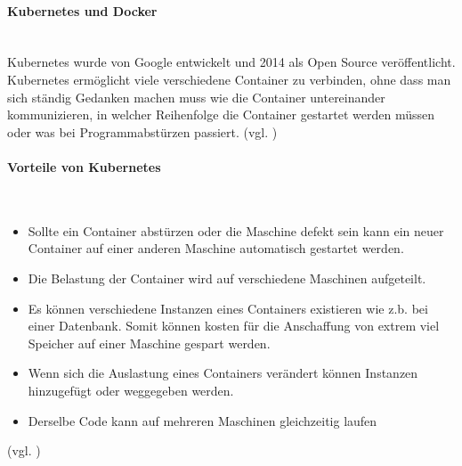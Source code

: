 \paragraph{Kubernetes und Docker}\mbox{}\\
Kubernetes wurde von Google entwickelt und 2014 als Open Source veröffentlicht. Kubernetes ermöglicht viele verschiedene Container zu verbinden, ohne dass man sich ständig Gedanken machen muss wie die Container untereinander kommunizieren, in welcher Reihenfolge die Container gestartet werden müssen oder was bei Programmabstürzen passiert. (vgl. \cite{DockerOrchestration})
\paragraph{Vorteile von Kubernetes}\mbox{}\\
\begin{itemize}
	\item Sollte ein Container abstürzen oder die Maschine defekt sein kann ein neuer Container auf einer anderen Maschine automatisch gestartet werden.
	\item Die Belastung der Container wird auf verschiedene Maschinen aufgeteilt.
	\item Es können verschiedene Instanzen eines Containers existieren wie z.b. bei einer Datenbank. Somit können kosten für die Anschaffung von extrem viel Speicher auf einer Maschine gespart werden.
	\item Wenn sich die Auslastung eines Containers verändert können Instanzen hinzugefügt oder weggegeben werden.
	\item Derselbe Code kann auf mehreren Maschinen gleichzeitig laufen
\end{itemize}
(vgl. \cite{DockerKubernetes})
